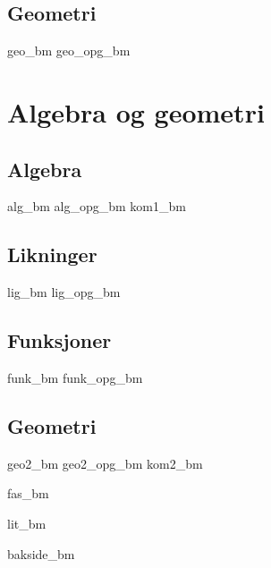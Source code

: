 \chapter{Geometri \label{Geometri}}
\newpage
{geo_bm}
{geo_opg_bm}

\part{Algebra og geometri \label{Del2}}
\chapter{Algebra \label{Algebra}}
\newpage
{alg_bm}
{alg_opg_bm}
\newpage
{kom1_bm}

\chapter{Likninger \label{Likningar}}
\newpage
{lig_bm}
{lig_opg_bm}

\chapter{Funksjoner \label{Funksjoner}}
{funk_bm}
{funk_opg_bm}

\chapter{Geometri \label{Geometri2}}
\newpage
{geo2_bm}
{geo2_opg_bm}
\newpage
{kom2_bm}

\newpage
{}
{}
{fas_bm}

{lit_bm}
{\printindex {}
	}
{bakside_bm}









